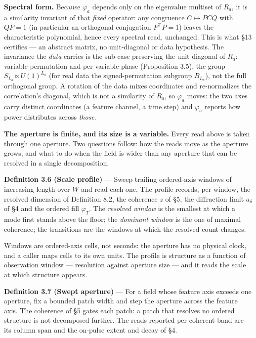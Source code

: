 \documentclass[10pt,letterpaper,twocolumn]{article}
\begin{document}
\textbf{Spectral form.} Because \(\varphi_a\) depends only on the eigenvalue multiset of \(R_a\), it is a similarity invariant of that \emph{fixed} operator: any congruence \(C\mapsto PCQ\) with \(QP=1\) (in particular an orthogonal conjugation \(P^{\mathsf\top}P=1\)) leaves the characteristic polynomial, hence every spectral read, unchanged. This is what §13 certifies --- an abstract matrix, no unit-diagonal or data hypothesis. The invariance the \emph{data} carries is the sub-case preserving the unit diagonal of \(R_a\): variable permutation and per-variable phase (Proposition 3.5), the group \(S_{L_a}\ltimes U(1)^{L_a}\) (for real data the signed-permutation subgroup \(B_{L_a}\)), not the full orthogonal group. A rotation of the data mixes coordinates and re-normalizes the correlation's diagonal, which is not a similarity of \(R_a\), so \(\varphi_a\) moves: the two axes carry distinct coordinates (a feature channel, a time step) and \(\varphi_a\) reports how power distributes across \emph{those}.

\textbf{The aperture is finite, and its size is a variable.} Every read above is taken through one aperture. Two questions follow: how the reads move as the aperture grows, and what to do when the field is wider than any aperture that can be resolved in a single decomposition.

\textbf{Definition 3.6 (Scale profile)} --- Sweep trailing ordered-axis windows of increasing length over \(W\) and read each one. The profile records, per window, the resolved dimension of Definition 8.2, the coherence \(z\) of §5, the diffraction limit \(a_\delta\) of §4 and the ordered fill \(\varphi_T\). The \emph{resolved window} is the smallest at which a mode first stands above the floor; the \emph{dominant window} is the one of maximal coherence; the transitions are the windows at which the resolved count changes.

Windows are ordered-axis cells, not seconds: the aperture has no physical clock, and a caller maps cells to its own units. The profile is structure as a function of observation window --- resolution against aperture size --- and it reads the scale at which structure appears.

\textbf{Definition 3.7 (Swept aperture)} --- For a field whose feature axis exceeds one aperture, fix a bounded patch width and step the aperture across the feature axis. The coherence of §5 gates each patch: a patch that resolves no ordered structure is not decomposed further. The reads reported per coherent band are its column span and the on-pulse extent and decay of §4.
\end{document}
